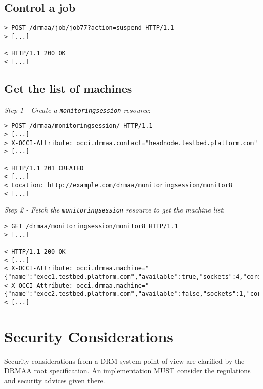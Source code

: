 \documentclass[10pt]{article}
\newcommand{\h}[1]{\lstinline|#1|}
\begin{document}
\subsection{Control a job}

\begin{verbatim}
> POST /drmaa/job/job77?action=suspend HTTP/1.1
> [...]

< HTTP/1.1 200 OK 
< [...] 
\end{verbatim}

\subsection{Get the list of machines}

\emph{Step 1 - Create a \h{monitoringsession} resource}:

\begin{verbatim}
> POST /drmaa/monitoringsession/ HTTP/1.1
> [...]
> X-OCCI-Attribute: occi.drmaa.contact="headnode.testbed.platform.com"
> [...]

< HTTP/1.1 201 CREATED 
< [...] 
< Location: http://example.com/drmaa/monitoringsession/monitor8
< [...]
\end{verbatim}

\emph{Step 2 - Fetch the \h{monitoringsession} resource to get the machine list}:

\begin{verbatim}
> GET /drmaa/monitoringsession/monitor8 HTTP/1.1
> [...]

< HTTP/1.1 200 OK 
< [...]
< X-OCCI-Attribute: occi.drmaa.machine="{"name":"exec1.testbed.platform.com","available":true,"sockets":4,"coresPerSocket":4,"threadsPerCore":2,"load":0.1,"physMemory":512000,"virtMemory":1000000,"machineOS":"LINUX",...}"
< X-OCCI-Attribute: occi.drmaa.machine="{"name":"exec2.testbed.platform.com","available":false,"sockets":1,"coresPerSocket":4,"threadsPerCore":1,"load":1.5,"physMemory":1000000,"virtMemory":2000000,"machineOS":"LINUX",...}"
< [...]
\end{verbatim}

\section{Security Considerations}
\label{sec:security}

Security considerations from a DRM system point of view are clarified by the DRMAA root specification. An implementation MUST consider the regulations and security advices given there. 
\end{document}
